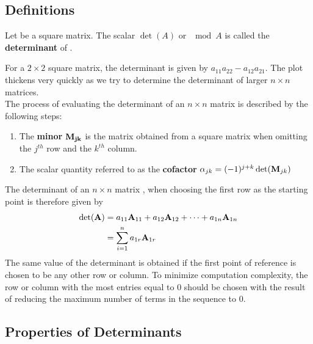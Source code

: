 

\subsection*{Definitions}

Let  be a square matrix. The scalar $\det(A)$ or $\mod{A}$  is called the \textbf{determinant} of .

For a  $2 \times 2$ square matrix, the determinant is given by $a_{11}a_{22} - a_{12}a_{21}$. The plot thickens very quickly as we try to determine the determinant of larger $n \times n$ matrices.\\

The process of evaluating the determinant of an $n \times n$ matrix is described by the following steps:
\begin{enumerate}
  \item The \textbf{minor} $\mathbf{M_{jk}}$ is the matrix obtained from a square matrix when omitting the $j^{th}$ row and the $k^{th}$ column.
  \item The scalar quantity referred to as the \textbf{cofactor} $\alpha_{jk} = (-1)^{j+k} \det(\mathbf{M}_{jk})$
\end{enumerate}
The determinant of an $n \times n$ matrix , when choosing the first row as the starting point is therefore given by 
    \begin{align*}
  \det(\mathbf{A}) &= a_{11}\mathbf{A}_{11} + a_{12}\mathbf{A}_{12} + \cdots + a_{1n}\mathbf{A}_{1n} \\
                 &= \sum_{i=1}^n a_{1r}\mathbf{A}_{1r}
\end{align*}
The same value of the determinant is obtained if the first point of reference is chosen to be any other row or column. To minimize computation complexity, the row or column with the most entries equal to 0 should be chosen with the result of reducing the maximum number of terms in the sequence to 0.

\subsection*{Properties of Determinants}

